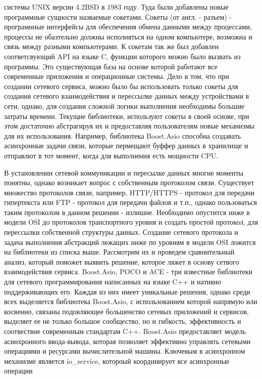 \documentclass[a4paper, 14pt]{extreport}
\begin{document}
системы UNIX версии 4.2BSD в 1983 году. Туда были добавлены новые программные сущности назваемые сокетами. Сокеты (от англ. - разъем)
- програмнные интерфейсы для обеспечения обмена данными между процессами, процессы не обазтельно должны исполняться на одном компьютере,
возможна и связь между разными компьютерами. К сокетам так же был добавлен соответсвующий API на языке C, функции которого можно было
вызвать из программы. Это существующая база на основе которой работают все современные приложения и операционные системы. Дело в том,
что при создании сетевого сервиса, можно было бы использовать только сокеты для создания сетевого взаимодействия и перессылке данных
между устройствами в сети, однако, для создания сложной логики выполнения необходимы большие затраты времени. Текущие библиотеки, 
используют сокеты в своей основе, при этом достаточно абстрагируя их и предоставляя пользователям новые механизмы для их использования.
Например, библиотека Boost.Asio способна создавать асинхронные задачи связи, которые пермещают буффер данных в хранилище и отправлют 
в тот момент, когда для выполнения есть мощности CPU.
\par В установлении сетевой коммуникации и пересылке данных многие моменты понятны, однако возникает вопрос с собственным протоколом 
связи. Существует множество протоколов связи, например, HTTP/HTTPS - протокол для передачи гипертекста или FTP - протокол для передачи
файлов и т.п., однако пользоваться таким протоколом в данном решении - излишне. Необходимо опустится ниже в модели OSI до протоколов
транспортного уровня и создать простой протокол, для перессылки собственной структуры данных. Создание сетевого протокола и задача 
выполнения абстракций лежащих ниже по уровням в модели OSI ложится на библиотеки из списка выше. Рассмотрим их и проведем сравнительный
анализ, который поможет выявить решение, которое ляжет в основу сетвого взаимодействия сервиса. Boost.Asio, POCO и ACE - три известные
библиотеки для сетевого программирования написанных на языке C++ и нативно поддерживающих его. Каждая из них имеет уникальные решения, 
однако среди всех выделяется библиотека Boost.Asio, с использованием которой напрямую или косвенно, связаны подовляющее большенство 
сетевых приложений и сервисов, выделяет ее не только большое сообщество, но и гибкость, эффективность и соотвествие современным 
стандартам C++. Boost.Asio предоставляет модель асинхронного ввода-вывода, которая позволяет эффективно управлять сетевыми операциями 
и ресурсами вычислительной машины. Ключевым в асинхронном механизме является io\_service, котороый координирует все асинхронные операции 
\end{document}
